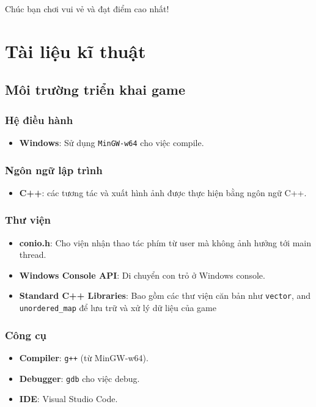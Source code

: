 \documentclass[12pt]{report}
\begin{document}
Chúc bạn chơi vui vẻ và đạt điểm cao nhất!

\chapter{Tài liệu kĩ thuật}
\label{sec:technical_detail}
\section{Môi trường triển khai game}
\subsection*{Hệ điều hành}
\begin{itemize}
    \item \textbf{Windows}: Sử dụng \texttt{MinGW-w64} cho việc compile.
\end{itemize}

\subsection*{Ngôn ngữ lập trình}
\begin{itemize}
    \item \textbf{C++}: các tương tác và xuất hình ảnh được thực hiện bằng ngôn ngữ C++.
\end{itemize}

\subsection*{Thư viện}
\begin{itemize}
    \item \textbf{conio.h}: Cho viện nhận thao tác phím từ user mà không ảnh hưởng tới main thread.
    \item \textbf{Windows Console API}: Di chuyển con trỏ ở Windows console.
    \item \textbf{Standard C++ Libraries}: Bao gồm các thư viện căn bản như \texttt{vector}, and \texttt{unordered\_map} để lưu trữ và xử lý dữ liệu của game
\end{itemize}

\subsection*{Công cụ}
\begin{itemize}
    \item \textbf{Compiler}: \texttt{g++} (từ MinGW-w64).
    \item \textbf{Debugger}: \texttt{gdb} cho việc debug.
    \item \textbf{IDE}: Visual Studio Code.
\end{itemize}
\end{document}
